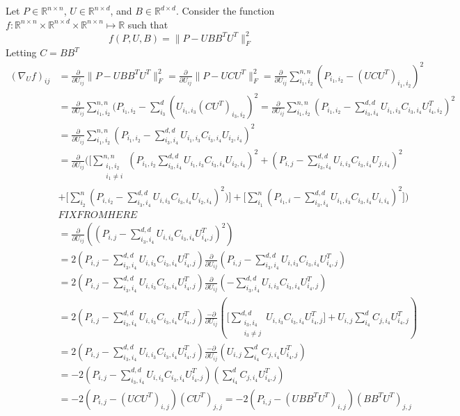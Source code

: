 \documentclass{report}
\begin{document}
   	\newpage
   	Let $ P \in \mathbb{R}^{n \times n} $, $ U \in \mathbb{R}^{n \times d} $, and $B \in \mathbb{R}^{d \times d} $. Consider the function $ f: \mathbb{R}^{n \times n} \times \mathbb{R}^{n \times d} \times \mathbb{R}^{n \times n} \mapsto \mathbb{R} $ such that 
   	\[ 
   	  f(P,U,B) = \|P - UBB^TU^T\|_F^2
   	\]
   	Letting $ C = BB^T $
   	\begin{align*}
   		 (\nabla_{U}f)_{ij}
   		 &= \frac{\partial}{\partial U_{ij}}\|P - UBB^TU^T\|_F^2 
   		  = \frac{\partial}{\partial U_{ij}}\|P - UCU^T\|_F^2 
   		  = \frac{\partial}{\partial U_{ij}}\displaystyle \sum_{i_1,i_2}^{n,n} (P_{i_1,i_2} -  (UCU^T)_{i_1,i_2})^2 \\
   		 &= \frac{\partial}{\partial U_{ij}} \sum_{i_1,i_2}^{n,n} (P_{i_1,i_2} -    \sum_{i_3}^{d}(U_{i_1,i_3}(CU^T)_{i_3,i_2})^2 
   		  = \frac{\partial}{\partial U_{ij}} \sum_{i_1,i_2}^{n,n} (P_{i_1,i_2} - \sum_{i_3,i_4}^{d,d}U_{i_1,i_3}C_{i_3,i_4}U^T_{i_4,i_2})^2 \\
   		 &= \frac{\partial}{\partial U_{ij}} \sum_{i_1,i_2}^{n,n} (P_{i_1,i_2} - \sum_{i_3,i_4}^{d,d}U_{i_1,i_3}C_{i_3,i_4}U_{i_2,i_4})^2 \\
   		 &= \frac{\partial}{\partial U_{ij}} (\big[\sum_{\substack{i_1,i_2 \\ i_1 \neq i}}^{n,n} (P_{i_1,i_2} \sum_{i_3,i_4}^{d,d}U_{i_1,i_3}C_{i_3,i_4}U_{i_2,i_4})^2
   		 + (P_{i,j} -\sum_{i_3,i_4}^{d,d}U_{i,i_3}C_{i_3,i_4}U_{j,i_4})^2 \\
   		 &+ \big[\sum_{i_2}^n(P_{i,i_2} - \sum_{i_3,i_4}^{d,d}U_{i,i_3}C_{i_3,i_4}U_{i_2,i_4})^2) \big]
   		 + \big[\sum_{i_1}^n(P_{i_1,i} - \sum_{i_3,i_4}^{d,d}U_{i_1,i_3}C_{i_3,i_4}U_{i,i_4})^2\big]) \\
   		 &FIX FROM HERE\\
   		 &= \frac{\partial}{\partial U_{ij}}((P_{i,j} - \sum_{i_3,i_4}^{d,d}U_{i,i_3}C_{i_3,i_4}U^T_{i_4,j})^2) \\
   		 &= 2(P_{i,j} - \sum_{i_3,i_4}^{d,d}U_{i,i_3}C_{i_3,i_4}U^T_{i_4,j})\frac{\partial}{\partial U_{ij}}(P_{i,j} - \sum_{i_3,i_4}^{d,d}U_{i,i_3}C_{i_3,i_4}U^T_{i_4,j}) \\
   		 &= 2(P_{i,j} - \sum_{i_3,i_4}^{d,d}U_{i,i_3}C_{i_3,i_4}U^T_{i_4,j})\frac{\partial}{\partial U_{ij}}(-\sum_{i_3,i_4}^{d,d}U_{i,i_3}C_{i_3,i_4}U^T_{i_4,j}) \\
   		 &= 2(P_{i,j} - \sum_{i_3,i_4}^{d,d}U_{i,i_3}C_{i_3,i_4}U^T_{i_4,j})\frac{-\partial}{\partial U_{ij}}(\big[\sum_{\substack{i_3,i_4\\ i_3 \neq j}}^{d,d}U_{i,i_3}C_{i_3,i_4}U^T_{i_4,j}\big] + U_{i,j}\sum_{i_4}^dC_{j,i_4}U^T_{i_4,j}) \\
   		 &=2(P_{i,j} - \sum_{i_3,i_4}^{d,d}U_{i,i_3}C_{i_3,i_4}U^T_{i_4,j})\frac{-\partial}{\partial U_{ij}}(U_{i,j}\sum_{i_4}^dC_{j,i_4}U^T_{i_4,j}) \\
   		 &= -2(P_{i,j} - \sum_{i_3,i_4}^{d,d}U_{i,i_3}C_{i_3,i_4}U^T_{i_4,j})(\sum_{i_4}^dC_{j,i_4}U^T_{i_4,j}) \\
   		 &= -2(P_{i,j} - (UCU^T)_{i,j})(CU^T)_{j,j}
   		 = -2(P_{i,j} - (UBB^TU^T)_{i,j})(BB^TU^T)_{j,j}   	
   		 \end{align*}
\end{document}
